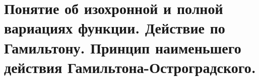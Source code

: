 \chapter{Понятие об изохронной и полной вариациях функции. Действие по
Гамильтону. Принцип наименьшего действия Гамильтона-Остроградского.}

\newpage
